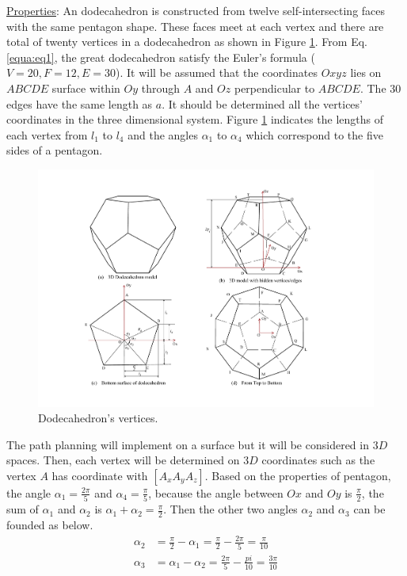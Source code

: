 \noindent\uline{Properties}: 
An dodecahedron is constructed from twelve self-intersecting faces with the same pentagon shape. These faces meet at each vertex and there are total of twenty vertices in a dodecahedron as shown in Figure \ref{fig:dodecahedron2}.
%
From Eq. \ref{equa:eq1}, the great dodecahedron satisfy the Euler's formula ($V=20, F=12, E=30$).
%
It will be assumed that the coordinates $Oxyz$ lies on $ABCDE$ surface within $Oy$ through $A$ and $Oz$ perpendicular to $ABCDE$.
%
The 30 edges have the same length as $a$. It should be determined all the vertices' coordinates in the three dimensional system.
%
Figure \ref{fig:dodecahedron2} indicates the lengths of each vertex from $l_1$ to $l_4$ and the angles $\alpha_1$ to $\alpha_4$ which correspond to the five sides of a pentagon.

\begin{figure}[h]
\centering
	\includegraphics[width=1\textwidth]{image/dodecahedron2.pdf}
	\caption{Dodecahedron's vertices.}
	\label{fig:dodecahedron2}
\end{figure}

\noindent The path planning will implement on a surface but it will be considered in $3D$ spaces. 
Then, each vertex will be determined on $3D$ coordinates such as the vertex $A$ has coordinate with $[A_x A_y A_z]$. 
Based on the properties of pentagon, the angle $\alpha_1=\frac{2\pi}{5}$ and $\alpha_4=\frac{\pi}{5}$, 
because the angle between $Ox$ and $Oy$ is $\frac{\pi}{2}$, the sum of $\alpha_1$ and $\alpha_2$ is $\alpha_1 + \alpha_2 = \frac{\pi}{2}$. 
Then the other two angles $\alpha_2$ and $\alpha_3$ can be founded as below. 
\begin{equation*} 
\label{equa:eq0}
\begin{split}
\alpha_2 &= \frac{\pi}{2}-\alpha_1 = \frac{\pi}{2}-\frac{2\pi}{5} = \frac{\pi}{10}\\ 
\alpha_3 &= \alpha_1-\alpha_2 = \frac{2\pi}{5}-\frac{pi}{10} = \frac{3\pi}{10}
\end{split}
\end{equation*}

